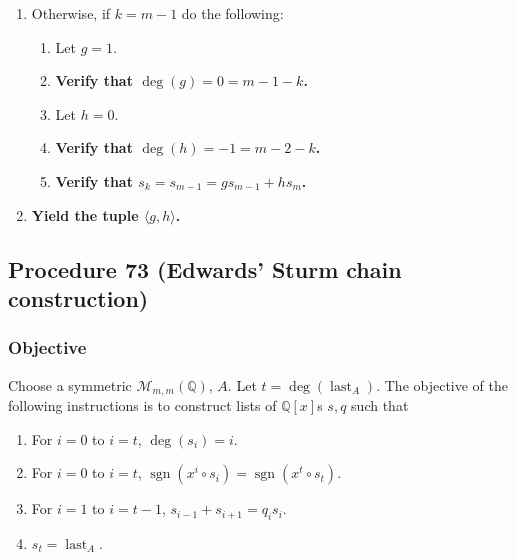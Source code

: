 \documentclass[twocolumn]{article}
\DeclareMathOperator{\sgn}{sgn}
\DeclareMathOperator{\last}{last}
\begin{document}
\begin{enumerate}
\begin{enumerate}
					\end{enumerate}
					\item Otherwise, if $k=m-1$ do the following:
					\begin{enumerate}
						\item Let $g=1$.
						\item \textbf{Verify that $\deg(g)=0=m-1-k$.}
						\item Let $h=0$.
						\item \textbf{Verify that $\deg(h)=-1=m-2-k$.}
						\item \textbf{Verify that $s_k=s_{m-1}=gs_{m-1}+hs_m$.}
					\end{enumerate}
					\item \textbf{Yield the tuple $\langle g,h\rangle$.}
				\end{enumerate}
		\subsection{Procedure 73 (Edwards' Sturm chain construction)}\label{sec:procedure 73}
			\subsubsection{Objective}
				Choose a symmetric $\mathcal{M}_{m,m}(\mathbb{Q})$, $A$. Let $t=\deg(\last_A)$. The objective of the following instructions is to construct lists of $\mathbb{Q}[x]$s $s,q$ such that
				\begin{enumerate}
					\item For $i=0$ to $i=t$, $\deg(s_i)=i$.
					\item For $i=0$ to $i=t$, $\sgn(x^i\circ s_i)=\sgn(x^t\circ s_t)$.
					\item For $i=1$ to $i=t-1$, $s_{i-1}+s_{i+1}=q_is_i$.
					\item $s_t=\last_A$.
				\end{enumerate}
\end{document}

